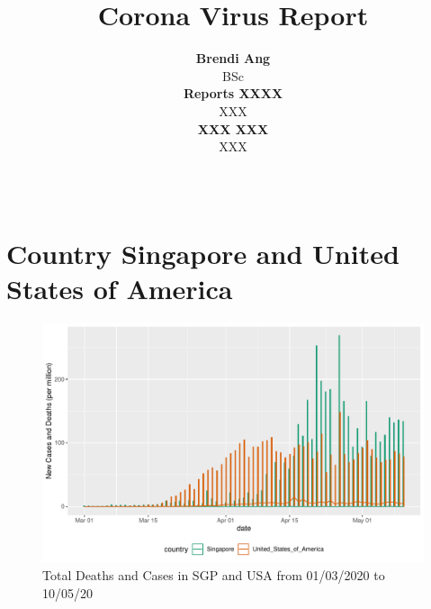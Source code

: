 \documentclass[11pt,a4paper,]{article}
\title{Corona Virus Report}
\author{\sf\Large\textbf{ Brendi Ang}\\ {\sf\large BSc\\[0.5cm]} \sf\Large\textbf{ Reports XXXX}\\ {\sf\large XXX\\[0.5cm]} \sf\Large\textbf{ XXX XXX}\\ {\sf\large XXX\\[0.5cm]}}
\date{\sf\Date~\Month~\Year}
\makeatletter
\def\titlepage{\front{\expandafter{\@title}}{\@author}{\@organization}}
\makeatother
\begin{document}
\titlepage

\section*{Country Singapore and United States of America}

\begin{figure}
\centering
\includegraphics{report_files/figure-latex/sgp-usa-barchart-1.pdf}
\caption{\label{fig:sgp-usa-barchart}Total Deaths and Cases in SGP and USA from 01/03/2020 to 10/05/20}
\end{figure}
\end{document}

